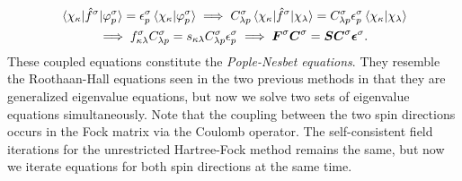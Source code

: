             \begin{gather}
                \mel*{\chi_{\kappa}}{\hat{f}^{\sigma}}{\varphi^{\sigma}_{p}}
                = \epsilon^{\sigma}_{p}
                \braket*{\chi_{\kappa}}{\varphi^{\sigma}_{p}}
                \implies
                C^{\sigma}_{\lambda p}
                \mel*{\chi_{\kappa}}{\hat{f}^{\sigma}}{\chi_{\lambda}}
                = C^{\sigma}_{\lambda p} \epsilon^{\sigma}_{p}
                \braket*{\chi_{\kappa}}{\chi_{\lambda}}
                \\
                \implies
                f^{\sigma}_{\kappa \lambda}
                C^{\sigma}_{\lambda p}
                =
                s_{\kappa\lambda}
                C^{\sigma}_{\lambda p}
                \epsilon^{\sigma}_{p}
                \implies
                \boldsymbol{F}^{\sigma}
                \boldsymbol{C}^{\sigma}
                =
                \boldsymbol{S}
                \boldsymbol{C}^{\sigma}
                \boldsymbol{\epsilon}^{\sigma}.
                \label{eq:pople-nesbet}
            \end{gather}
            These coupled equations constitute the \emph{Pople-Nesbet
            equations}.
            They resemble the Roothaan-Hall equations seen in the two previous
            methods in that they are generalized eigenvalue equations, but now
            we solve two sets of eigenvalue equations simultaneously.
            Note that the coupling between the two spin directions occurs in the
            Fock matrix via the Coulomb operator.
            The self-consistent field iterations for the unrestricted
            Hartree-Fock method remains the same, but now we iterate equations
            for both spin directions at the same time.

